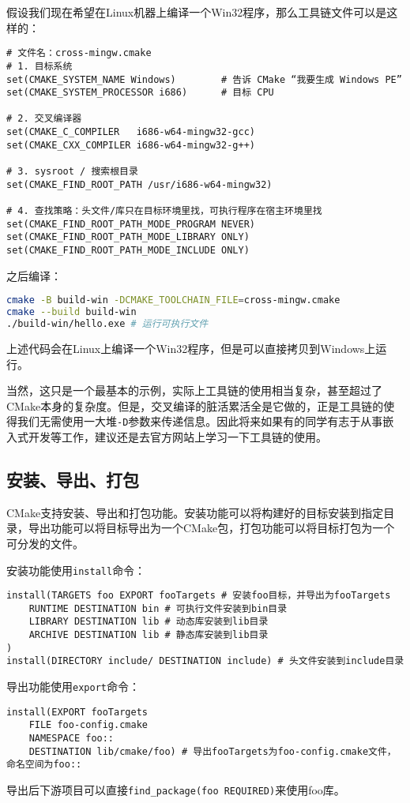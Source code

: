 假设我们现在希望在Linux机器上编译一个Win32程序，那么工具链文件可以是这样的：
\begin{lstlisting}
# 文件名：cross-mingw.cmake
# 1. 目标系统
set(CMAKE_SYSTEM_NAME Windows)        # 告诉 CMake “我要生成 Windows PE”
set(CMAKE_SYSTEM_PROCESSOR i686)      # 目标 CPU

# 2. 交叉编译器
set(CMAKE_C_COMPILER   i686-w64-mingw32-gcc)
set(CMAKE_CXX_COMPILER i686-w64-mingw32-g++)

# 3. sysroot / 搜索根目录
set(CMAKE_FIND_ROOT_PATH /usr/i686-w64-mingw32)

# 4. 查找策略：头文件/库只在目标环境里找，可执行程序在宿主环境里找
set(CMAKE_FIND_ROOT_PATH_MODE_PROGRAM NEVER)
set(CMAKE_FIND_ROOT_PATH_MODE_LIBRARY ONLY)
set(CMAKE_FIND_ROOT_PATH_MODE_INCLUDE ONLY)
\end{lstlisting}
之后编译：
\begin{lstlisting}[language=bash]
cmake -B build-win -DCMAKE_TOOLCHAIN_FILE=cross-mingw.cmake
cmake --build build-win
./build-win/hello.exe # 运行可执行文件
\end{lstlisting}
上述代码会在Linux上编译一个Win32程序，但是可以直接拷贝到Windows上运行。

当然，这只是一个最基本的示例，实际上工具链的使用相当复杂，甚至超过了CMake本身的复杂度。但是，交叉编译的脏活累活全是它做的，正是工具链的使得我们无需使用一大堆\texttt{-D}参数来传递信息。因此将来如果有的同学有志于从事嵌入式开发等工作，建议还是去官方网站上学习一下工具链的使用。

\subsection{安装、导出、打包}

CMake支持安装、导出和打包功能。安装功能可以将构建好的目标安装到指定目录，导出功能可以将目标导出为一个CMake包，打包功能可以将目标打包为一个可分发的文件。

安装功能使用\texttt{install}命令：
\begin{lstlisting}
install(TARGETS foo EXPORT fooTargets # 安装foo目标，并导出为fooTargets
    RUNTIME DESTINATION bin # 可执行文件安装到bin目录
    LIBRARY DESTINATION lib # 动态库安装到lib目录
    ARCHIVE DESTINATION lib # 静态库安装到lib目录
)
install(DIRECTORY include/ DESTINATION include) # 头文件安装到include目录
\end{lstlisting}

导出功能使用\texttt{export}命令：
\begin{lstlisting}
install(EXPORT fooTargets
    FILE foo-config.cmake
    NAMESPACE foo::
    DESTINATION lib/cmake/foo) # 导出fooTargets为foo-config.cmake文件，命名空间为foo::
\end{lstlisting}
导出后下游项目可以直接\texttt{find\_package(foo REQUIRED)}来使用foo库。

